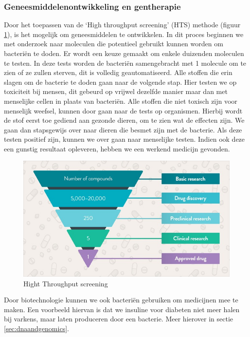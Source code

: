 \documentclass[a4paper,kul]{kulakarticle} %
\begin{document}
\subsubsection{Geneesmiddelenontwikkeling en gentherapie}
Door het toepassen van de `High throughput screening' (HTS) methode (figuur \ref{fig:hts}), is het mogelijk om geneesmiddelen te ontwikkelen. In dit proces beginnen we met onderzoek naar moleculen die potentieel gebruikt kunnen worden om bacteriën te doden. Er wordt een keuze gemaakt om enkele duizenden moleculen te testen. In deze tests worden de bacteriën samengebracht met 1 molecule om te zien of ze zullen sterven, dit is volledig geautomatiseerd. Alle stoffen die erin slagen om de bacterie te doden gaan naar de volgende stap. Hier testen we op toxiciteit bij mensen, dit gebeurd op vrijwel dezelfde manier maar dan met menselijke cellen in plaats van bacteriën. Alle stoffen die niet toxisch zijn voor menselijk weefsel, kunnen door gaan naar de tests op organismen. Hierbij wordt de stof eerst toe gediend aan gezonde dieren, om te zien wat de effecten zijn. We gaan dan stapsgewijs over naar dieren die besmet zijn met de bacterie. Als deze testen positief zijn, kunnen we over gaan naar menselijke testen. Indien ook deze een gunstig resultaat opleveren, hebben we een werkend medicijn gevonden.\\
\begin{figure}[h]
	\centering
	\includegraphics[width=0.7\linewidth]{HTS}
	\caption[HTS]{Hight Throughput screening}
	\label{fig:hts}
\end{figure}

\noindent
Door biotechnologie kunnen we ook bacteriën gebruiken om medicijnen mee te maken. Een voorbeeld hiervan is dat we insuline voor diabeten niet meer halen bij varkens, maar laten produceren door een bacterie. Meer hierover in sectie \ref{sec:dnaandgenomics}.
\end{document}
